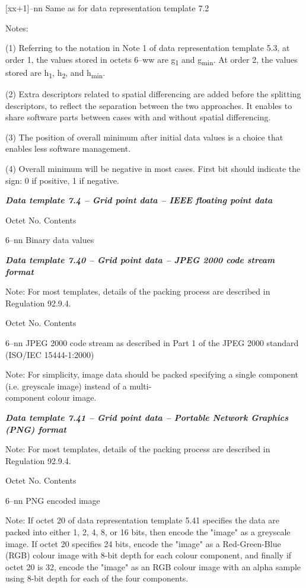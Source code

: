 {[}xx+1{]}--nn Same as for data representation template 7.2

Notes:

(1) Referring to the notation in Note 1 of data representation template 5.3, at order 1, the values stored in octets 6--ww are g\textsubscript{1} and g\textsubscript{min}. At order 2, the values stored are h\textsubscript{1}, h\textsubscript{2}, and h\textsubscript{min}.

(2) Extra descriptors related to spatial differencing are added before the splitting descriptors, to reflect the separation between the two approaches. It enables to share software parts between cases with and without spatial differencing.

(3) The position of overall minimum after initial data values is a choice that enables less software management.

(4) Overall minimum will be negative in most cases. First bit should indicate the sign: 0 if positive, 1 if negative.

\emph{\textbf{Data template 7.4 -- Grid point data -- IEEE floating point data}}

Octet No. Contents

6--nn Binary data values

\emph{\textbf{Data template 7.40 -- Grid point data -- JPEG 2000 code stream format}}

Note: For most templates, details of the packing process are described in Regulation 92.9.4.

Octet No. Contents

6--nn JPEG 2000 code stream as described in Part 1 of the JPEG 2000 standard\\
(ISO/IEC 15444-1:2000)

Note: For simplicity, image data should be packed specifying a single component (i.e. greyscale image) instead of a multi-\\
component colour image.

\emph{\textbf{Data template 7.41 -- Grid point data -- Portable Network Graphics (PNG) format}}

Note: For most templates, details of the packing process are described in Regulation 92.9.4.

Octet No. Contents

6--nn PNG encoded image

Note: If octet 20 of data representation template 5.41 specifies the data are packed into either 1, 2, 4, 8, or 16 bits, then encode the "image" as a greyscale image. If octet 20 specifies 24 bits, encode the "image" as a Red-Green-Blue (RGB) colour image with 8-bit depth for each colour component, and finally if octet 20 is 32, encode the "image" as an RGB colour image with an alpha sample using 8-bit depth for each of the four components.

